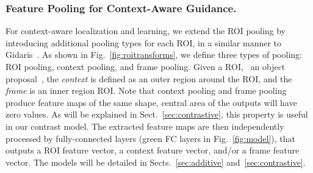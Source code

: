 \documentclass[runningheads]{llncs}
\begin{document}
\subsubsection{Feature Pooling for Context-Aware Guidance.} For context-aware localization and
learning, we extend the ROI pooling by introducing additional pooling types 
for each ROI, in a similar manner to Gidaris~\etal\cite{Gidaris:2015cx}. 
As shown in Fig.~\ref{fig:roitransforms}, 
we define three types of pooling: ROI pooling, context pooling, and frame pooling. 
Given a ROI, \ie ~an object proposal~\cite{uijlings2013selective}, 
the {\it context} is defined as an outer region around the ROI, and the {\it frame} is an inner region ROI. Note that context pooling and frame pooling produce feature maps of the same shape, \ie central area of the outputs will have zero values. As will be explained in Sect.~\ref{sec:contrastive}, this property is useful in our contrast model.
The extracted feature maps are then independently
processed by fully-connected layers (green FC layers in Fig.~\ref{fig:model}), that outputs a ROI feature vector, a context feature vector, and/or a frame feature vector.   
The models will be detailed in Sects.~\ref{sec:additive}
and~\ref{sec:contrastive}. 
\end{document}
